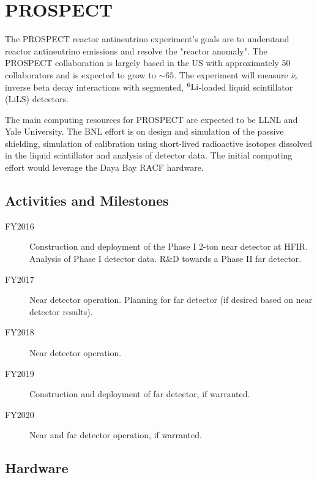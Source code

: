 \documentclass[pdftex,12pt,letter]{article}
\begin{document}
\pagebreak
\section{PROSPECT}

The PROSPECT reactor antineutrino experiment's goals are to understand
reactor antineutrino emissions and resolve the "reactor anomaly". The
PROSPECT collaboration is largely based in the US with approximately
50 collaborators and is expected to grow to $\sim\!65$. 
The experiment will measure $\bar\nu_e$ inverse beta decay interactions
with segmented, ${}^6{\rm Li}$-loaded liquid scintillator (LiLS)
detectors.

The main computing resources for PROSPECT are expected to be LLNL and
Yale University. The BNL effort is on design and simulation of the passive shielding,
simulation of calibration using short-lived radioactive isotopes
dissolved in the liquid scintillator and analysis of detector
data. The initial computing effort would leverage the Daya Bay RACF
hardware. 
\subsection{Activities and Milestones}

\begin{description}
\item[FY2016] Construction and deployment of the Phase I 2-ton near detector at HFIR.
				Analysis of Phase I detector data. R\&D towards a Phase II far detector.
\item[FY2017] Near detector operation. Planning for far detector (if desired based on near
			detector results).
\item[FY2018] Near detector operation. 
\item[FY2019] Construction and deployment of far detector, if warranted.
\item[FY2020] Near and far detector operation, if warranted.
\end{description}

\subsection{Hardware}
\end{document}
